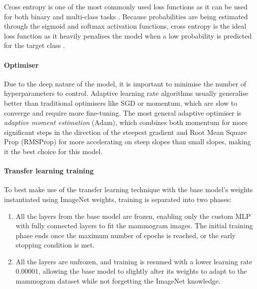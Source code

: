 Cross entropy is one of the most commonly used loss functions as it can be used for both binary and multi-class tasks \citep{Litjens2017}. Because probabilities are being estimated through the sigmoid and softmax activation functions, cross entropy is the ideal loss function as it heavily penalises the model when a low probability is predicted for the target class \citep{Geron2019}.

\paragraph{Optimiser}

Due to the deep nature of the model, it is important to minimise the number of hyperparameters to control. Adaptive learning rate algorithms usually generalise better than traditional optimisers like SGD or momentum, which are slow to converge and require more fine-tuning. The most general adaptive optimiser is \textit{adaptive moment estimation} (Adam), which combines both momentum for more significant steps in the direction of the steepest gradient and Root Mean Square Prop (RMSProp) for more accelerating on steep slopes than small slopes, making it the best choice for this model.

\paragraph{Transfer learning training}
\label{sec:design-transfer-learning-training-phase}

To best make use of the transfer learning technique with the base model's weights instantiated using ImageNet weights, training is separated into two phases:
\begin{enumerate}
    \item All the layers from the base model are frozen, enabling only the custom MLP with fully connected layers to fit the mammogram images. The initial training phase ends once the maximum number of epochs is reached, or the early stopping condition is met.
    \item All the layers are unfrozen, and training is resumed with a lower learning rate $0.00001$, allowing the base model to slightly alter its weights to adapt to the mammogram dataset while not forgetting the ImageNet knowledge.
\end{enumerate}

